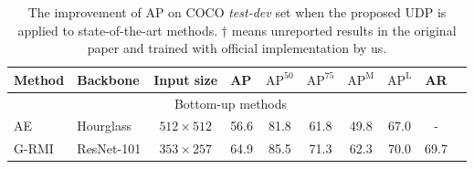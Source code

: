 \documentclass[10pt,journal,compsoc]{IEEEtran}
\begin{document}
\begin{table*}
\caption{The improvement of AP on COCO \textit{test-dev} set when the proposed UDP is applied to state-of-the-art methods. $\dagger$ means unreported results in the original paper and trained with official implementation by us.}
\label{tab:test-dev}
\begin{center}
\begin{tabular}{l|l|c|lcccccc}

\hline
Method                             & Backbone         &Input size  &AP   & $\text{AP}^{50}$ & $\text{AP}^{75}$ & $\text{AP}^{\text{M}}$ &$\text{AP}^{\text{L}}$ &AR  \\
\hline
\multicolumn{9}{c}{Bottom-up methods}\\
\hline

AE \cite{AssociativeEmbedding}     & Hourglass\cite{Hourglass}   &$512\times512$    &56.6                  & 81.8              & 61.8         & 49.8          &67.0           &-   \\
G-RMI\cite{G-RMI}                  & ResNet-101     &$353\times 257$  &64.9                  & 85.5              & 71.3         & 62.3          &70.0           &69.7\\


\end{tabular}
\end{center}
\end{table*}
\end{document}
